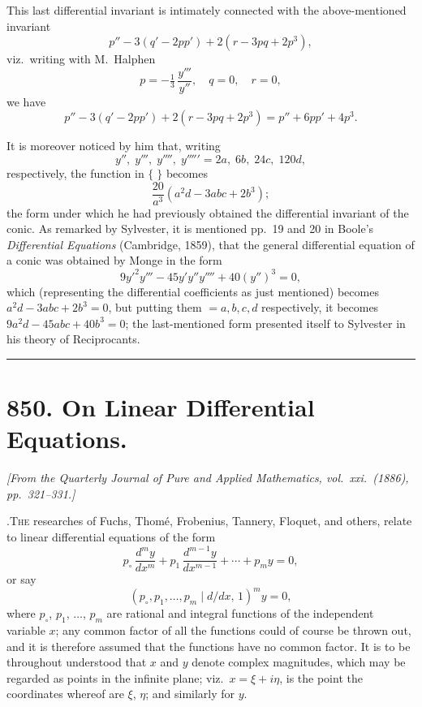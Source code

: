 \documentclass[11pt]{article}
\begin{document}
This last differential invariant is intimately connected with the above-mentioned invariant
\[
p'' - 3(q' - 2pp') + 2(r - 3pq + 2p^3),
\]
viz.\ writing with M.\ Halphen
\[
p = -\tfrac{1}{3}\,\frac{y'''}{y''},\quad q = 0,\quad r = 0,
\]
we have
\[
p'' - 3(q' - 2pp') + 2(r - 3pq + 2p^3) = p'' + 6pp' + 4p^3.
\]

It is moreover noticed by him that, writing
\[
y'',\; y''',\; y'''',\; y'''''=2a,\; 6b,\; 24c,\; 120d,
\]
respectively, the function in $\{\;\}$ becomes
\[
\frac{20}{a^3}(a^2d - 3abc + 2b^3);
\]
the form under which he had previously obtained the differential invariant of the conic. As remarked by Sylvester, it is mentioned pp.\ 19 and 20 in Boole's \emph{Differential Equations} (Cambridge, 1859), that the general differential equation of a conic was obtained by Monge in the form
\[
9y'^2y''' - 45y'y''y'''' + 40(y'')^3 = 0,
\]
which (representing the differential coefficients as just mentioned) becomes $a^2d - 3abc + 2b^3 = 0$, but putting them $=a,b,c,d$ respectively, it becomes $9a^2d - 45abc + 40b^3 = 0$; the last-mentioned form presented itself to Sylvester in his theory of Reciprocants.

\bigskip\bigskip
\hrule
\bigskip

\section*{850. On Linear Differential Equations.}

\noindent\textit{[From the Quarterly Journal of Pure and Applied Mathematics, vol.\ xxi.\ (1886), pp.\ 321--331.]}

\medskip

.\quad \textsc{The} researches of Fuchs, Thom\'e, Frobenius, Tannery, Floquet, and others, relate to linear differential equations of the form
\[
p_{\circ}\,\frac{d^m y}{dx^m} + p_1\,\frac{d^{m-1}y}{dx^{m-1}} + \dotsb + p_m y = 0,
\]
or say
\[
(p_{\circ},p_1,\dotsc,p_m\mid d/dx,\,1)^m y = 0,
\]
where $p_{\circ}$, $p_1$, $\dotsc$, $p_m$ are rational and integral functions of the independent variable $x$; any common factor of all the functions could of course be thrown out, and it is therefore assumed that the functions have no common factor. It is to be throughout understood that $x$ and $y$ denote complex magnitudes, which may be regarded as points in the infinite plane; viz.\ $x = \xi + i\eta$, is the point the coordinates whereof are $\xi$, $\eta$; and similarly for $y$.

\medskip
\end{document}
